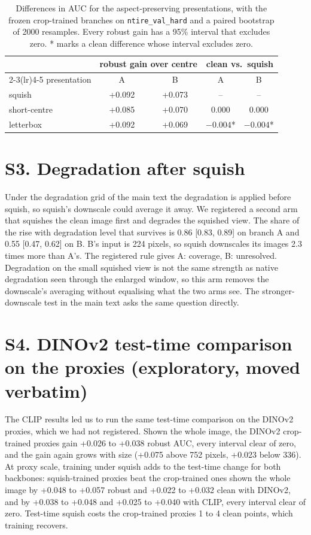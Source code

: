 \documentclass[10pt]{article}
\begin{document}
\begin{table}[h]
\centering
\small
\begin{tabular}{lcccc}
\toprule
 & \multicolumn{2}{c}{robust gain over centre} & \multicolumn{2}{c}{clean vs.\ squish} \\
\cmidrule(lr){2-3}\cmidrule(lr){4-5}
presentation & A & B & A & B \\
\midrule
squish & +0.092 & +0.073 & -- & -- \\
short-centre & +0.085 & +0.070 & 0.000 & 0.000 \\
letterbox & +0.092 & +0.069 & $-0.004$* & $-0.004$* \\
\bottomrule
\end{tabular}
\caption{Differences in AUC for the aspect-preserving presentations, with the
frozen crop-trained branches on \texttt{ntire\_val\_hard} and a paired
bootstrap of 2000 resamples. Every robust gain
has a 95\% interval that excludes zero. * marks a clean difference whose
interval excludes zero.}
\label{tab:aspect}
\end{table}

\section*{S3. Degradation after squish}

Under the degradation grid of the main text the degradation is applied
before squish, so squish's downscale could average it away. We registered a
second arm that squishes the clean image first and degrades the squished
view. The share of the rise with degradation level that survives is 0.86
[0.83, 0.89] on branch A and 0.55 [0.47, 0.62] on B. B's input is 224 pixels,
so squish downscales its images 2.3 times more than A's. The registered rule
gives A: coverage, B: unresolved. Degradation on the small squished view is
not the same strength as native degradation seen through the enlarged window,
so this arm removes the downscale's averaging without equalising what the two
arms see. The stronger-downscale test in the main text asks the same
question directly.

\section*{S4. DINOv2 test-time comparison on the proxies (exploratory, moved verbatim)}

The CLIP results led us to run the same test-time comparison on the DINOv2
proxies, which we had not registered. Shown the whole image, the DINOv2
crop-trained proxies gain +0.026 to +0.038 robust AUC, every interval clear
of zero, and the gain again grows with size (+0.075 above 752 pixels, +0.023
below 336). At proxy scale, training under squish adds to the test-time
change for both backbones: squish-trained proxies beat the crop-trained ones
shown the whole image by +0.048 to +0.057 robust and +0.022 to +0.032 clean
with DINOv2, and by +0.038 to +0.048 and +0.025 to +0.040 with CLIP, every
interval clear of zero. Test-time squish costs the crop-trained proxies 1 to
4 clean points, which training recovers.
\end{document}

